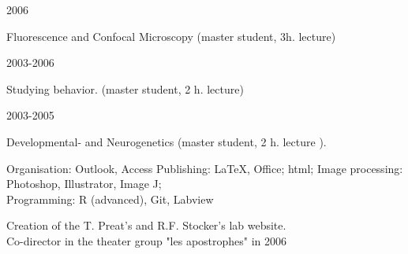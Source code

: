 \parbox{0.15\textwidth}{2006}\hfill
\parbox[t]{0.83\textwidth}{Fluorescence and Confocal Microscopy (master student, 3h. lecture)}
\parbox{0.15\textwidth}{2003-2006}\hfill
\parbox[t]{0.83\textwidth}{Studying behavior. (master student, 2 h. lecture)}
\parbox{0.15\textwidth}{2003-2005}\hfill
\parbox[t]{0.83\textwidth}{Developmental- and Neurogenetics %
(master student, 2 h. lecture%
).}


%
%
%
%
%
%
%
%
%
%
%
%
%
%
Organisation: Outlook, Access
Publishing: \LaTeX, Office; html;
 Image processing: Photoshop, Illustrator, Image J; 
\\Programming:  R (advanced), Git, Labview

Creation of the T. Preat's and R.F. Stocker's lab website.
\\
Co-director in the theater group "les apostrophes" in
2006


